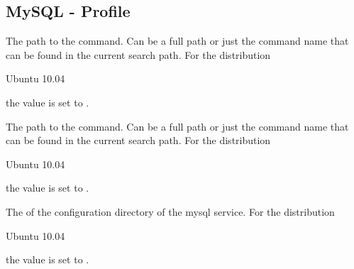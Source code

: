 \label{sec:mysql_profile}
\subsection{MySQL - Profile}


The  path to the  command. Can be a full path or
just the command name that can be found in the current search path. 
For the distribution
\begin{inparaitem}
\item[\TheDistribution{ubuntu}] Ubuntu 10.04
\end{inparaitem}
the value is set to .


The  path to the  command. Can be a full path or
just the command name that can be found in the current search path.
For the distribution
\begin{inparaitem}
\item[\TheDistribution{ubuntu}] Ubuntu 10.04
\end{inparaitem}
the value is set to .


The  of the configuration directory of the mysql service. 
For the distribution
\begin{inparaitem}
\item[\TheDistribution{ubuntu}] Ubuntu 10.04
\end{inparaitem}
the value is set to .


